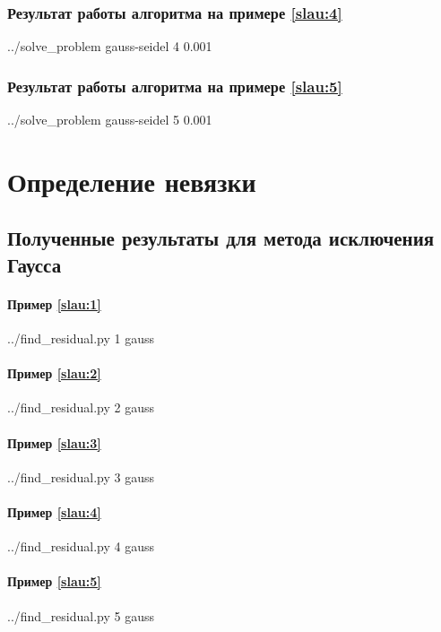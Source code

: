 \documentclass[a4paper]{article}
\begin{document}
\subsubsection{Результат работы алгоритма на примере \eqref{slau:4}}
\bash[stdout]
../solve_problem gauss-seidel 4 0.001
\END

\subsubsection{Результат работы алгоритма на примере \eqref{slau:5}}
\bash[stdout]
../solve_problem gauss-seidel 5 0.001
\END

\section{Определение невязки}


\subsection{Полученные результаты для метода исключения Гаусса}

\paragraph{Пример \eqref{slau:1}}
\bash[stdout]
../find_residual.py 1 gauss
\END

\paragraph{Пример \eqref{slau:2}}
\bash[stdout]
../find_residual.py 2 gauss
\END

\paragraph{Пример \eqref{slau:3}}
\bash[stdout]
../find_residual.py 3 gauss
\END

\paragraph{Пример \eqref{slau:4}}
\bash[stdout]
../find_residual.py 4 gauss
\END

\paragraph{Пример \eqref{slau:5}}
\bash[stdout]
../find_residual.py 5 gauss
\END
\end{document}
